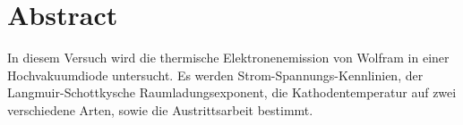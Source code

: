 \section{Abstract}
\label{sec:Abstract}
In diesem Versuch wird die thermische Elektronenemission von Wolfram in einer Hochvakuumdiode untersucht. Es werden Strom-Spannungs-Kennlinien, der Langmuir-Schottkysche Raumladungsexponent, die Kathodentemperatur auf zwei verschiedene Arten, sowie die Austrittsarbeit bestimmt.
